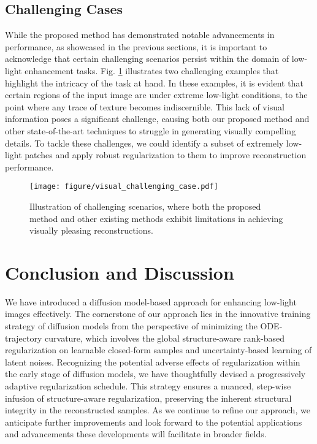\documentclass{article}
\begin{document}
\subsection{Challenging Cases} While the proposed method has demonstrated notable advancements in performance, as showcased in the previous sections, it is important to acknowledge that certain challenging scenarios persist within the domain of low-light enhancement tasks. Fig. \ref{fig:visual-challenging-case} illustrates two challenging examples that highlight the intricacy of the task at hand. In these examples, it is evident that certain regions of the input image are under extreme low-light conditions, to the point where any trace of texture becomes indiscernible. This lack of visual information poses a significant challenge, causing both our proposed method and other state-of-the-art techniques to struggle in generating visually compelling details. To tackle these challenges, we could identify a subset of extremely low-light patches and apply robust regularization to them to improve reconstruction performance.

\begin{figure}[t]
\centering
\texttt{[image: figure/visual\_challenging\_case.pdf]}\vspace{-0.4cm}
\caption{Illustration of challenging scenarios, where both the proposed method and other existing methods exhibit limitations in achieving visually pleasing reconstructions.
}
\label{fig:visual-challenging-case}
\vspace{-0.3cm}
\end{figure}














\section{Conclusion and Discussion}
We have introduced a diffusion model-based approach for enhancing low-light images effectively.
The cornerstone of our approach lies in the innovative training strategy of diffusion models from the perspective of minimizing the ODE-trajectory curvature, which involves the global structure-aware rank-based regularization on learnable closed-form samples and uncertainty-based learning of latent noises.
Recognizing the potential adverse effects of regularization within the early stage of diffusion models, we have thoughtfully devised a progressively adaptive regularization schedule. This strategy ensures a nuanced, step-wise infusion of structure-aware regularization, preserving the inherent structural integrity in the reconstructed samples.
As we continue to refine our approach, we anticipate further improvements and look forward to the potential applications and advancements these developments will facilitate in broader fields.
\end{document}
